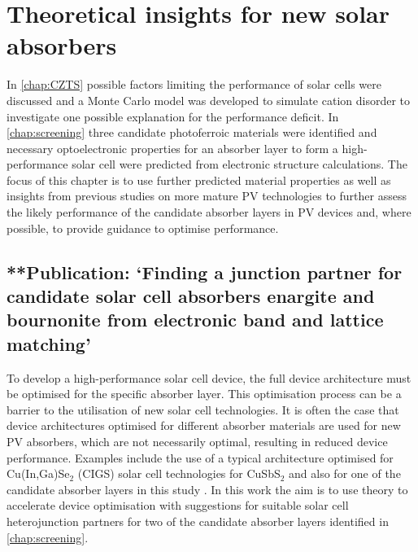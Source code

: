 \documentclass[11pt, twoside]{report}
\begin{document}
\chapter{Theoretical insights for new solar absorbers}\label{chap:insights}

In \autoref{chap:CZTS} possible factors limiting the performance of {\CZTS} solar cells were discussed and a Monte Carlo model was developed to simulate cation disorder to investigate one possible explanation for the performance deficit. In \autoref{chap:screening} three candidate photoferroic materials were identified and necessary optoelectronic properties for an absorber layer to form a high-performance solar cell were predicted from electronic structure calculations. The focus of this chapter is to use further predicted material properties as well as insights from previous studies on more mature PV technologies to further assess the likely performance of the candidate absorber layers in PV devices and, where possible, to provide guidance to optimise performance.


\section{**Publication: `Finding a junction partner for candidate solar cell absorbers enargite and bournonite from electronic band and lattice matching'}\label{sulfosalt_band_alignment}

To develop a high-performance solar cell device, the full device architecture must be optimised for the specific absorber layer. This optimisation process can be a barrier to the utilisation of new solar cell technologies. It is often the case that device architectures optimised for different absorber materials are used for new PV absorbers, which are not necessarily optimal, resulting in reduced device performance. Examples include the use of a typical architecture optimised for Cu(In,Ga)Se$_2$ (CIGS) solar cell technologies for CuSbS$_2$ \cite{CAS_alignment} and also for one of the candidate absorber layers in this study {\enargite} \cite{enargite_SC}. In this work the aim is to use theory to accelerate device optimisation with suggestions for suitable solar cell heterojunction partners for two of the candidate absorber layers identified in \autoref{chap:screening}. 
\end{document}

